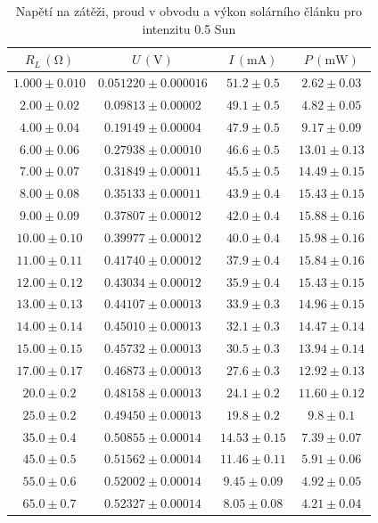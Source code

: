 \documentclass{../concepts/prepareprotokol} %
\begin{document}
\begin{table}[hbtp]
\centering
\caption{Napětí na zátěži, proud v obvodu a výkon solárního článku pro intenzitu 0.5 Sun}
\begin{tabular}{cccc}
 \toprule
 $R_L\, (\mathrm{\Omega})$ & $U\, (\mathrm{V})$ & $I\, (\mathrm{mA})$ & $P\, (\mathrm{mW})$ \\  
 \midrule
 $1.000 \pm 0.010$ & $0.051220 \pm 0.000016$ & $51.2 \pm 0.5$ & $2.62 \pm 0.03$ \\
 $2.00 \pm 0.02$ & $0.09813 \pm 0.00002$ & $49.1 \pm 0.5$ & $4.82 \pm 0.05$ \\
 $4.00 \pm 0.04$ & $0.19149 \pm 0.00004$ & $47.9 \pm 0.5$ & $9.17 \pm 0.09$ \\
 $6.00 \pm 0.06$ & $0.27938 \pm 0.00010$ & $46.6 \pm 0.5$ & $13.01 \pm 0.13$ \\
 $7.00 \pm 0.07$ & $0.31849 \pm 0.00011$ & $45.5 \pm 0.5$ & $14.49 \pm 0.15$ \\
 $8.00 \pm 0.08$ & $0.35133 \pm 0.00011$ & $43.9 \pm 0.4$ & $15.43 \pm 0.15$ \\
 $9.00 \pm 0.09$ & $0.37807 \pm 0.00012$ & $42.0 \pm 0.4$ & $15.88 \pm 0.16$ \\
 $10.00 \pm 0.10$ & $0.39977 \pm 0.00012$ & $40.0 \pm 0.4$ & $15.98 \pm 0.16$ \\
 $11.00 \pm 0.11$ & $0.41740 \pm 0.00012$ & $37.9 \pm 0.4$ & $15.84 \pm 0.16$ \\
 $12.00 \pm 0.12$ & $0.43034 \pm 0.00012$ & $35.9 \pm 0.4$ & $15.43 \pm 0.15$ \\
 $13.00 \pm 0.13$ & $0.44107 \pm 0.00013$ & $33.9 \pm 0.3$ & $14.96 \pm 0.15$ \\
 $14.00 \pm 0.14$ & $0.45010 \pm 0.00013$ & $32.1 \pm 0.3$ & $14.47 \pm 0.14$ \\
 $15.00 \pm 0.15$ & $0.45732 \pm 0.00013$ & $30.5 \pm 0.3$ & $13.94 \pm 0.14$ \\
 $17.00 \pm 0.17$ & $0.46873 \pm 0.00013$ & $27.6 \pm 0.3$ & $12.92 \pm 0.13$ \\
 $20.0 \pm 0.2$ & $0.48158 \pm 0.00013$ & $24.1 \pm 0.2$ & $11.60 \pm 0.12$ \\
 $25.0 \pm 0.2$ & $0.49450 \pm 0.00013$ & $19.8 \pm 0.2$ & $9.8 \pm 0.1$ \\
 $35.0 \pm 0.4$ & $0.50855 \pm 0.00014$ & $14.53 \pm 0.15$ & $7.39 \pm 0.07$ \\
 $45.0 \pm 0.5$ & $0.51562 \pm 0.00014$ & $11.46 \pm 0.11$ & $5.91 \pm 0.06$ \\
 $55.0 \pm 0.6$ & $0.52002 \pm 0.00014$ & $9.45 \pm 0.09$ & $4.92 \pm 0.05$ \\
 $65.0 \pm 0.7$ & $0.52327 \pm 0.00014$ & $8.05 \pm 0.08$ & $4.21 \pm 0.04$ \\
 \bottomrule
\end{tabular}
\label{tab:50}
\end{table}
\end{document}
